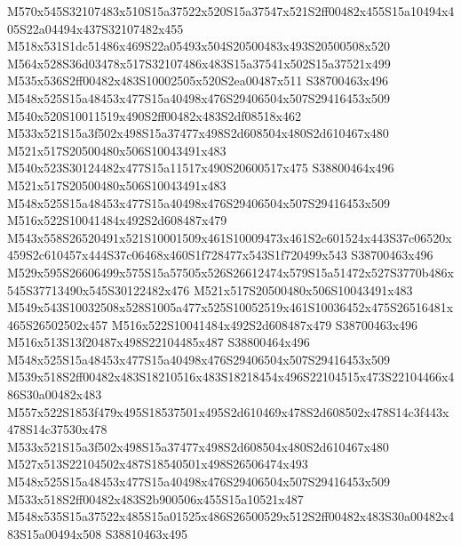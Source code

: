 \documentclass{article}
\begin{document}
\begin{multicols}{2}


M570x545S32107483x510S15a37522x520S15a37547x521S2ff00482x455S15a10494x405S22a04494x437S32107482x455 M518x531S1dc51486x469S22a05493x504S20500483x493S20500508x520 M564x528S36d03478x517S32107486x483S15a37541x502S15a37521x499 M535x536S2ff00482x483S10002505x520S2ea00487x511 S38700463x496 M548x525S15a48453x477S15a40498x476S29406504x507S29416453x509 M540x520S10011519x490S2ff00482x483S2df08518x462 M533x521S15a3f502x498S15a37477x498S2d608504x480S2d610467x480 M521x517S20500480x506S10043491x483 M540x523S30124482x477S15a11517x490S20600517x475 S38800464x496 M521x517S20500480x506S10043491x483 M548x525S15a48453x477S15a40498x476S29406504x507S29416453x509 M516x522S10041484x492S2d608487x479 M543x558S26520491x521S10001509x461S10009473x461S2c601524x443S37c06520x459S2c610457x444S37c06468x460S1f728477x543S1f720499x543 S38700463x496 M529x595S26606499x575S15a57505x526S26612474x579S15a51472x527S3770b486x545S37713490x545S30122482x476 M521x517S20500480x506S10043491x483 M549x543S10032508x528S1005a477x525S10052519x461S10036452x475S26516481x465S26502502x457 M516x522S10041484x492S2d608487x479 S38700463x496 M516x513S13f20487x498S22104485x487 S38800464x496 M548x525S15a48453x477S15a40498x476S29406504x507S29416453x509 M539x518S2ff00482x483S18210516x483S18218454x496S22104515x473S22104466x486S30a00482x483 M557x522S1853f479x495S18537501x495S2d610469x478S2d608502x478S14c3f443x478S14c37530x478 M533x521S15a3f502x498S15a37477x498S2d608504x480S2d610467x480 M527x513S22104502x487S18540501x498S26506474x493 M548x525S15a48453x477S15a40498x476S29406504x507S29416453x509 M533x518S2ff00482x483S2b900506x455S15a10521x487 M548x535S15a37522x485S15a01525x486S26500529x512S2ff00482x483S30a00482x483S15a00494x508 S38810463x495





\end{multicols}
\end{document}
